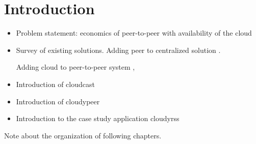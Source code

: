 \chapter{Introduction}

\begin{itemize}
  \item Problem statement: economics of peer-to-peer with availability
    of the cloud
  \item Survey of existing solutions.
    Adding peer to centralized solution \cite{PeerAssistedVoD}
    \cite{BitTorrentRobustness}
    \cite{RapidCloudProvisioningLeaveragingP2P} \cite{AmazingStore}.

    Adding cloud to peer-to-peer system \cite{AngelsInCloud}, \cite{PeerAssistredOnlineDataBackup}

  \item Introduction of cloudcast
  \item Introduction of cloudypeer
  \item Introduction to the case study application cloudyrss
\end{itemize}

Note about the organization of following chapters.
